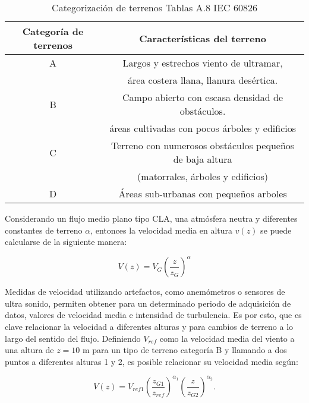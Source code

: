 \begin{table}[h] 
	\begin{footnotesize} 
		\begin{center} 
			\begin{tabular}{|c||c|}
				\hline
				\textbf{Categoría de terrenos}& \textbf{Características del terreno}  \\\hline
				A & Largos y estrechos viento de ultramar,  \\
				& área costera llana, llanura desértica.    \\ \hline
				B & Campo abierto con escasa densidad de obstáculos. \\
				& áreas cultivadas con pocos árboles y edificios     \\ \hline
				C &  Terreno con numerosos obstáculos pequeños de baja altura \\
				& (matorrales, árboles y edificios)  \\ \hline
				D & Áreas sub-urbanas con pequeños arboles     \\ \hline
			\end{tabular}
		\end{center} 
		\caption{Categorización de terrenos Tablas A.8 IEC 60826}
	\end{footnotesize} 
	\label{TablaTerrenos} 
\end{table}

Considerando un flujo medio plano tipo CLA, una atmósfera neutra y diferentes constantes de terreno $\alpha$, entonces la velocidad media en altura $v(z)$ se puede calcularse de la siguiente manera:

\begin{equation}\label{LeyPotencial}
	V(z)=V_{G}\left(\frac{z}{z_{G}}\right)^\alpha
\end{equation}

Medidas de velocidad utilizando artefactos, como anemómetros o sensores de ultra sonido, permiten obtener para un determinado periodo de adquisición de datos, valores de velocidad media e intensidad de turbulencia. Es por esto, que es clave relacionar la velocidad a diferentes alturas y para cambios de terreno a lo largo del sentido del flujo. Definiendo $V_{ref}$ como la velocidad media del viento a una altura de $z=10$ m para un tipo de terreno categoría B y llamando a dos puntos a diferentes alturas 1 y 2, es posible relacionar su velocidad media según:

\begin{equation}\label{RelacionPotencial}
	V(z)=V_{ref1}\left(\frac{z_{G1}}{z_{ref}}\right)^{\alpha_1}\left(\frac{z}{z_{G2}}\right)^{\alpha_2}.
\end{equation}

